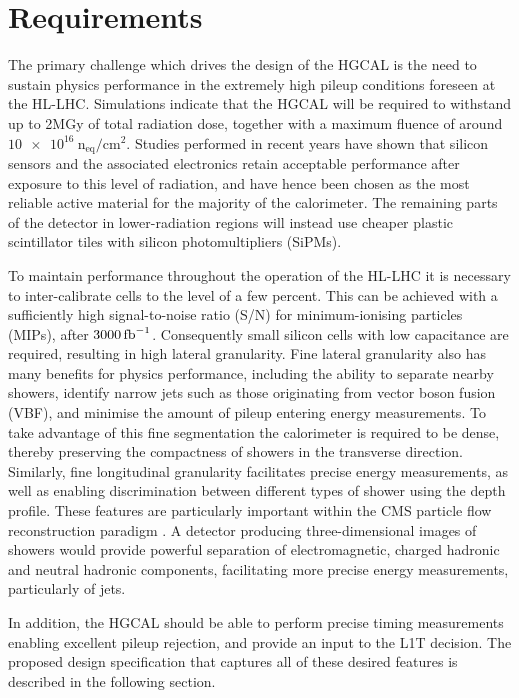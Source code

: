 \section{Requirements}

The primary challenge which drives the design of the HGCAL is the need to sustain physics performance in the extremely high pileup conditions foreseen at the HL-LHC.
Simulations indicate that the HGCAL will be required to withstand up to 2MGy of total radiation dose, together with a maximum fluence of around $\SI{10e16}{\textrm{n}_{\textrm{eq}}/\textrm{cm}^2}.$
Studies performed in recent years have shown that silicon sensors and the associated electronics retain acceptable performance after exposure to this level of radiation, 
and have hence been chosen as the most reliable active material for the majority of the calorimeter.
The remaining parts of the detector in lower-radiation regions will instead use cheaper plastic scintillator tiles with silicon photomultipliers (SiPMs).

To maintain performance throughout the operation of the HL-LHC it is necessary to inter-calibrate cells to the level of a few percent.
This can be achieved with a sufficiently high signal-to-noise ratio (S/N) for minimum-ionising particles (MIPs), after $\SI{3000}{\ensuremath{\textrm{fb}^{-1}}}$.
Consequently small silicon cells with low capacitance are required, resulting in high lateral granularity.
Fine lateral granularity also has many benefits for physics performance, including the ability to separate nearby showers, 
identify narrow jets such as those originating from vector boson fusion (VBF), and minimise the amount of pileup entering energy measurements.
To take advantage of this fine segmentation the calorimeter is required to be dense, thereby preserving the compactness of showers in the transverse direction.
Similarly, fine longitudinal granularity facilitates precise energy measurements, as well as enabling discrimination between different types of shower using the depth profile.
These features are particularly important within the CMS particle flow reconstruction paradigm \cite{ParticleFlow}.
A detector producing three-dimensional images of showers would provide powerful separation of electromagnetic, charged hadronic and neutral hadronic components,
facilitating more precise energy measurements, particularly of jets.

In addition, the HGCAL should be able to perform precise timing measurements enabling excellent pileup rejection, and provide an input to the L1T decision.
The proposed design specification that captures all of these desired features is described in the following section.

